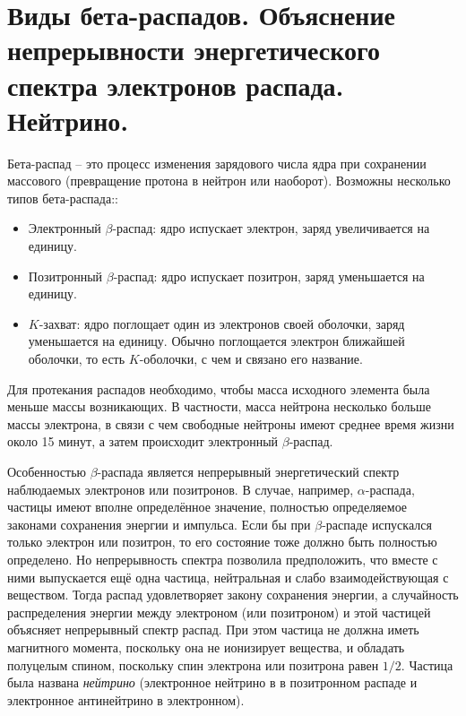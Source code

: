 \section{Виды бета-распадов. Объяснение непрерывности энергетического спектра электронов распада.
Нейтрино.}

Бета-распад -- это процесс изменения зарядового числа ядра при сохранении массового (превращение протона в нейтрон или наоборот). Возможны несколько типов бета-распада::

\begin{itemize}
    \item Электронный $\beta$-распад: ядро испускает электрон, заряд увеличивается на единицу.
    \item Позитронный $\beta$-распад: ядро испускает позитрон, заряд уменьшается на единицу.
    \item $K$-захват: ядро поглощает один из электронов своей оболочки, заряд уменьшается на единицу. Обычно поглощается электрон ближайшей оболочки, то есть $K$-оболочки, с чем и связано его название.
\end{itemize}

Для протекания распадов необходимо, чтобы масса исходного элемента была меньше массы возникающих. В частности, масса нейтрона несколько больше массы электрона, в связи с чем свободные нейтроны имеют среднее время жизни около 15 минут, а затем происходит электронный $\beta$-распад.

Особенностью $\beta$-распада является непрерывный энергетический спектр наблюдаемых электронов или позитронов. В случае, например, $\alpha$-распада, частицы имеют вполне определённое значение, полностью определяемое законами сохранения энергии и импульса. Если бы при $\beta$-распаде испускался только электрон или позитрон, то его состояние тоже должно быть полностью определено. Но непрерывность спектра позволила предположить, что вместе с ними выпускается ещё одна частица, нейтральная и слабо взаимодействующая с веществом. Тогда распад удовлетворяет закону сохранения энергии, а случайность распределения энергии между электроном (или позитроном) и этой частицей объясняет непрерывный спектр распад. При этом частица не должна иметь магнитного момента, поскольку она не ионизирует вещества, и обладать полуцелым спином, поскольку спин электрона или позитрона равен $1 / 2$. Частица была названа \textit{нейтрино} (электронное нейтрино в в позитронном распаде и электронное антинейтрино в электронном).